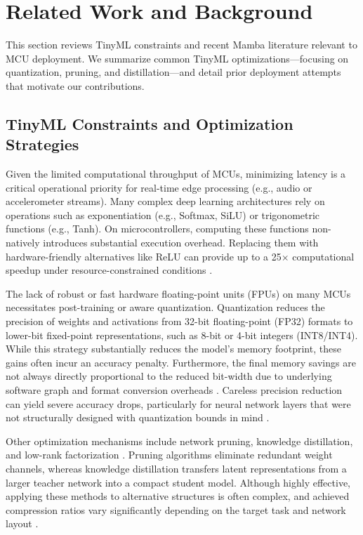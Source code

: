 \section{Related Work and Background}
\label{sec:background}

This section reviews TinyML constraints and recent Mamba literature relevant to MCU deployment. We summarize common TinyML optimizations—focusing on quantization, pruning, and distillation—and detail prior deployment attempts that motivate our contributions.

\subsection{TinyML Constraints and Optimization Strategies}

Given the limited computational throughput of MCUs, minimizing latency is a critical operational priority for real-time edge processing (e.g., audio or accelerometer streams). Many complex deep learning architectures rely on operations such as exponentiation (e.g., Softmax, SiLU) or trigonometric functions (e.g., Tanh). On microcontrollers, computing these functions non-natively introduces substantial execution overhead. Replacing them with hardware-friendly alternatives like ReLU can provide up to a 25$\times$ computational speedup under resource-constrained conditions \cite{cassimonDesigningResourceconstrainedNeural2020}.

The lack of robust or fast hardware floating-point units (FPUs) on many MCUs necessitates post-training or aware quantization. Quantization reduces the precision of weights and activations from 32-bit floating-point (FP32) formats to lower-bit fixed-point representations, such as 8-bit or 4-bit integers (INT8/INT4). While this strategy substantially reduces the model's memory footprint, these gains often incur an accuracy penalty. Furthermore, the final memory savings are not always directly proportional to the reduced bit-width due to underlying software graph and format conversion overheads \cite{dokicInferenceSpeedQuantisation2020}. Careless precision reduction can yield severe accuracy drops, particularly for neural network layers that were not structurally designed with quantization bounds in mind \cite{xuMambaQuantQuantizingMamba2025}.

Other optimization mechanisms include network pruning, knowledge distillation, and low-rank factorization \cite{suwannaphongOptimisingTinyMLQuantization2025}. Pruning algorithms eliminate redundant weight channels, whereas knowledge distillation transfers latent representations from a larger teacher network into a compact student model. Although highly effective, applying these methods to alternative structures is often complex, and achieved compression ratios vary significantly depending on the target task and network layout \cite{shihabEfficientUnstructuredPruning}.


